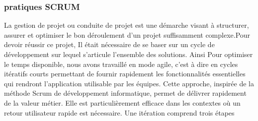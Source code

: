 \documentclass[a4paper, 12pt]{report}
\begin{document}
\subsubsection{pratiques SCRUM}
La gestion de projet ou conduite de projet est une démarche visant à structurer, assurer et optimiser le bon déroulement d'un projet suffisamment complexe.Pour devoir réussir ce projet,
Il était nécessaire de se baser sur un cycle de développement sur lequel s'articule l'ensemble des solutions.
Ainsi Pour optimiser le temps disponible, nous avons travaillé en mode agile, c'est à dire en cycles itératifs courts permettant de fournir rapidement les fonctionnalités essentielles qui rendront l'application utilisable par les équipes.
Cette approche, inspirée de la méthode Scrum de développement informatique, permet de délivrer rapidement de la valeur métier.
Elle est particulièrement efficace dans les contextes où un retour utilisateur rapide est nécessaire.
 Une itération comprend trois étapes
\end{document}
